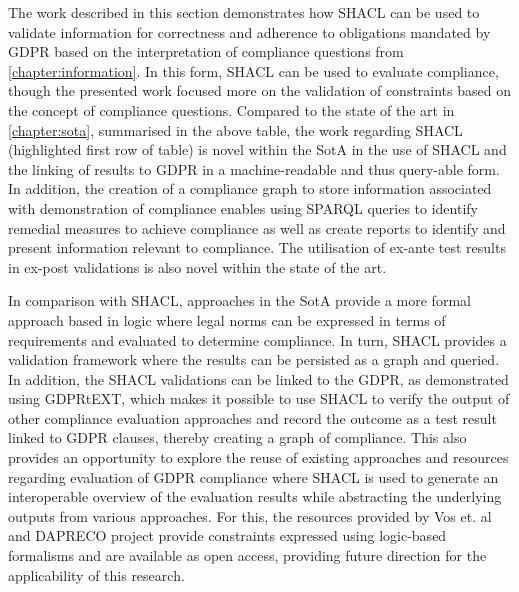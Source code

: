 The work described in this section demonstrates how SHACL can be used to validate information for correctness and adherence to obligations mandated by GDPR based on the interpretation of compliance questions from \autoref{chapter:information}. In this form, SHACL can be used to evaluate compliance, though the presented work focused more on the validation of constraints based on the concept of compliance questions.
Compared to the state of the art in \autoref{chapter:sota}, summarised in the above table, the work regarding SHACL (highlighted first row of table) is novel within the SotA in the use of SHACL and the linking of results to GDPR in a machine-readable and thus query-able form.
In addition, the creation of a compliance graph to store information associated with demonstration of compliance enables using SPARQL queries to identify remedial measures to achieve compliance as well as create reports to identify and present information relevant to compliance.
The utilisation of ex-ante test results in ex-post validations is also novel within the state of the art.

In comparison with SHACL, approaches in the SotA provide a more formal approach based in logic where legal norms can be expressed in terms of requirements and evaluated to determine compliance.
In turn, SHACL provides a validation framework where the results can be persisted as a graph and queried. In addition, the SHACL validations can be linked to the GDPR, as demonstrated using GDPRtEXT, which makes it possible to use SHACL to verify the output of other compliance evaluation approaches and record the outcome as a test result linked to GDPR clauses, thereby creating a graph of compliance.
This also provides an opportunity to explore the reuse of existing approaches and resources regarding evaluation of GDPR compliance where SHACL is used to generate an interoperable overview of the evaluation results while abstracting the underlying outputs from various approaches.
For this, the resources provided by Vos et. al \cite{vos_odrl_2019} and DAPRECO project \cite{bartolini_agile_2019} provide constraints expressed using logic-based formalisms and are available as open access, providing future direction for the applicability of this research.


